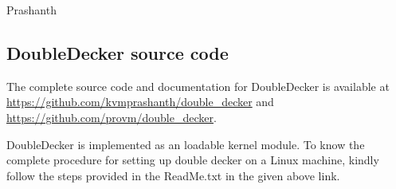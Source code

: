 \documentclass[11pt,a4paper]{report}
\newcommand{\dd}{DoubleDecker}
\begin{document}
    \vspace*{2em}
    \noindent Prashanth
    
    
  \tableofcontents
  \listoffigures
  \listoftables
  \cleardoublepage
  \setcounter{page}{1}
  \setlength{\parskip}{1em}
  
    
   
  
  
  
  
  
  
  
    
  
  \appendix
  \begin{appendices}
    \chapter{\dd{} source code}
      The complete source code and documentation 
      for \dd{} is available at \url{https://github.com/kvmprashanth/double_decker} and
      \url{https://github.com/provm/double_decker}.
      
      \dd{} is implemented as an loadable kernel module. To know the complete procedure for setting up double decker on
      a Linux machine, kindly follow the steps provided in the ReadMe.txt in the given above link.
    
  \end{appendices}
\end{document}
